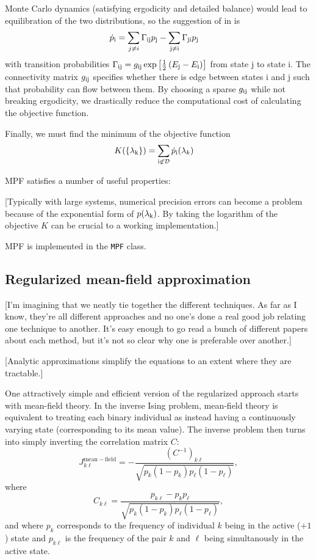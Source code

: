 \documentclass[aps,prl,twocolumn]{revtex4-1}
\begin{document}
Monte Carlo dynamics (satisfying ergodicity and detailed balance) would lead to equilibration of the two distributions, so the suggestion of in \cite{SohlDickstein:2011im} is
\begin{align}
	\dot{p}_{\rm i} &= \sum_{j\neq i} \Gamma_{\rm ij} p_{\rm j} -\sum_{\rm j\neq i} \Gamma_{\rm ji} p_{\rm j}
\end{align}
with transition probabilities $\Gamma_{\rm ij} = g_{\rm ij}\exp\left[ \frac{1}{2}\left( E_{\rm j}-E_{\rm i} \right) \right]$ from state j to state i. The connectivity matrix $g_{\rm ij}$ specifies whether there is edge between states i and j such that probability can flow between them. By choosing a sparse $g_{\rm ij}$ while not breaking ergodicity, we drastically reduce the computational cost of calculating the objective function.

Finally, we must find the minimum of the objective function
\begin{align}
	K(\{\lambda_{\rm k}\}) &= \sum_{\rm i \not\in \mathcal{D}} \dot{p}_{\rm i}(\lambda_k)
\end{align}

MPF satisfies a number of useful properties:

[Typically with large systems, numerical precision errors can become a problem because of the exponential form of $p(\lambda_{\rm k})$. By taking the logarithm of the objective $K$ can be crucial to a working implementation.]

MPF is implemented in the {\tt MPF} class.


\subsection{Regularized mean-field approximation}
[I'm imagining that we neatly tie together the different techniques. As far as I know, they're all different approaches and no one's done a real good job relating one technique to another. It's easy enough to go read a bunch of different papers about each method, but it's not so clear why one is preferable over another.]

[Analytic approximations simplify the equations to an extent where they are tractable.]

One attractively simple and efficient version of the regularized approach starts
with mean-field theory.  In the inverse Ising problem, mean-field theory is equivalent
to treating each binary individual as instead having a continuously varying state
(corresponding to its mean value).  The inverse problem then turns into simply inverting
the correlation matrix $C$: \cite{CocMon12}
\begin{equation}
\label{meanFieldSolution}
J^{\mathrm{mean-field}}_{k\ell} =
    - \frac{ (C^{-1})_{k\ell} }{ \sqrt{p_k(1-p_k)p_\ell(1-p_\ell)} },
\end{equation}
where
\begin{equation}
C_{k\ell} = \frac{ p_{k\ell} - p_k p_\ell }{ \sqrt{p_k(1-p_k)p_\ell(1-p_\ell)} },
\end{equation}
and where $p_k$ corresponds to the frequency of individual $k$ being
in the active ($+1$) state and $p_{k\ell}$ is the frequency of the pair
$k$ and $\ell$ being simultanously in the active state.
\end{document}
